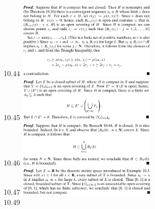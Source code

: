 \documentclass[3pt,landscape]{article}
\begin{document}
\begin{multicols}{3}
    10.44
    \includegraphics[width=250]{10_44.png} \\
    10.45
    \includegraphics[width=250]{10_45.png} \\
    10.46
    \includegraphics[width=250]{10_46.png} \\
    10.47
    \includegraphics[width=250]{10_47.png} \\
    10.49

\end{multicols}
\end{document}
